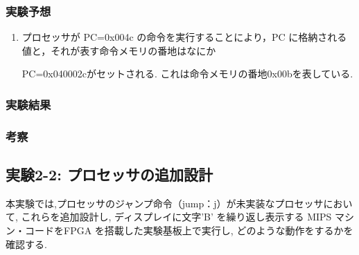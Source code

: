 \documentclass[epsf,a4paper,dvipdfmx,autodetect-engine,titlepage]{jsarticle}
\begin{document}
\subsubsection{実験予想}
\begin{enumerate}
    \item プロセッサが PC=0x004c の命令を実行することにより，PC に格納される値と，それが表す命令メモリの番地はなにか \par
    PC=0x040002cがセットされる. これは命令メモリの番地0x00bを表している.
\end{enumerate}
\subsubsection{実験結果}
\subsubsection{考察}

\subsection{実験2-2: プロセッサの追加設計}
本実験では,プロセッサのジャンプ命令（jump：j）が未実装なプロセッサにおいて, これらを追加設計し, ディスプレイに文字’B’ を繰り返し表示する MIPS マシン・コードをFPGA を搭載した実験基板上で実行し, どのような動作をするかを確認する.
\end{document}
